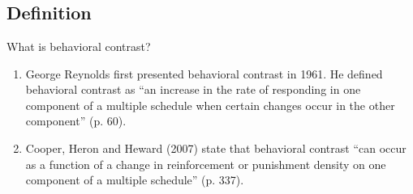 \clearpage \section{\foureSeven{}}
\subsection{Definition}
What is behavioral contrast?
\begin{enumerate}
\item George Reynolds first presented behavioral contrast in 1961. He defined behavioral contrast as ``an increase in the rate of responding in one component of a multiple schedule when certain changes occur in the other component'' (p. 60). 
\item Cooper, Heron and Heward (2007) state that behavioral contrast ``can occur as a function of a change in reinforcement or punishment density on one component of a multiple schedule'' (p. 337).
\end{enumerate}
%
